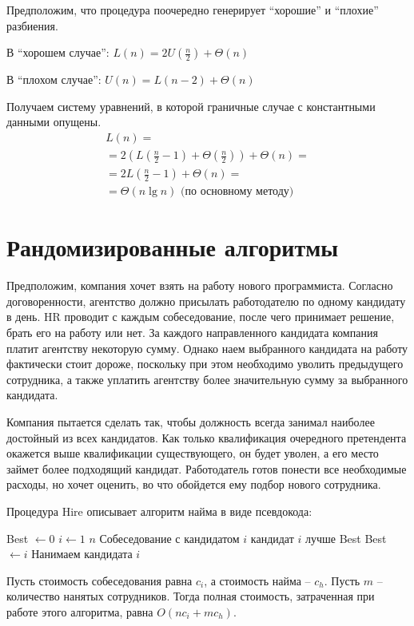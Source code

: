\documentclass[11pt]{article}
\begin{document}
Предположим, что процедура поочередно генерирует ``хорошие'' и ``плохие'' разбиения.

В ``хорошем случае'': $L(n) = 2U(\frac{n}{2}) + \Theta(n)$

В ``плохом случае'': $U(n) = L(n-2) + \Theta(n)$

Получаем систему уравнений, в которой граничные случае с константными данными опущены.
\begin{align*}
L(n) = \\
	= 2(L(\frac{n}{2} -1) + \Theta(\frac{n}{2})) + \Theta(n) = \\
	= 2L(\frac{n}{2} -1) + \Theta(n) = \\
	= \Theta(n \lg n) \text{ (по основному методу)}
\end{align*}

\section{Рандомизированные алгоритмы}

Предположим, компания хочет взять на работу нового программиста. Согласно договоренности, 
агентство должно присылать работодателю по одному кандидату в день. HR проводит с каждым
собеседование, после чего принимает решение, брать его на работу или нет. За каждого
направленного кандидата компания платит агентству некоторую сумму. Однако наем выбранного
кандидата на работу фактически стоит дороже, поскольку при этом необходимо уволить
предыдущего сотрудника, а также уплатить агентству более значительную сумму за выбранного кандидата.

Компания пытается сделать так, чтобы должность всегда занимал наиболее достойный из всех
кандидатов. Как только квалификация очередного претендента окажется выше квалификации
существующего, он будет уволен, а его место займет более подходящий кандидат.
Работодатель готов понести все необходимые расходы, но хочет оценить, во что обойдется ему
подбор нового сотрудника. 

Процедура Hire описывает алгоритм найма в виде псевдокода:
\begin{codebox}
\li	Best $ \gets 0$
\li	\For $i \gets 1$ \To $n$
\li		\Do Собеседование с кандидатом $i$
\li			\If кандидат $i$ лучше Best
\li				\Then Best $ \gets i$
\li				Нанимаем кандидата $i$
				\End
			\End
		\End
	\End
\end{codebox}

Пусть стоимость собеседования равна $c_i$, а стоимость найма -- $c_h$. Пусть $m$ -- количество
нанятых сотрудников. Тогда полная стоимость, затраченная при работе этого алгоритма, равна $O(n c_i + m c_h)$.
\end{document}
